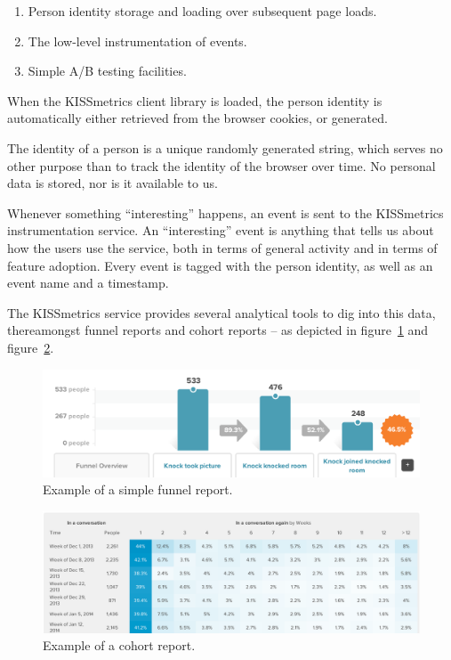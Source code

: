 \begin{enumerate}
  \item Person identity storage and loading over subsequent page loads.
  \item The low-level instrumentation of events.
  \item Simple A/B testing facilities.
\end{enumerate}

When the KISSmetrics client library is loaded, the person identity is automatically either retrieved from the browser cookies, or generated.

The identity of a person is a unique randomly generated string, which serves no other purpose than to track the identity of the browser over time. No personal data is stored, nor is it available to us.

Whenever something ``interesting'' happens, an event is sent to the KISSmetrics instrumentation service. An ``interesting'' event is anything that tells us about how the users use the service, both in terms of general activity and in terms of feature adoption. Every event is tagged with the person identity, as well as an event name and a timestamp.

The KISSmetrics service provides several analytical tools to dig into this data, thereamongst funnel reports and cohort reports -- as depicted in figure~\ref{fig:funnel-report} and figure~\ref{fig:cohort-report}.

\begin{figure}[h]
  \centering
    \includegraphics[width=\textwidth]{Figures/screenshots/km/funnel-example}
    \caption{Example of a simple funnel report.}
    \label{fig:funnel-report}
\end{figure}

\begin{figure}[h]
  \centering
    \includegraphics[width=\textwidth]{Figures/screenshots/km/cohort-example}
    \caption{Example of a cohort report.}
    \label{fig:cohort-report}
\end{figure}

